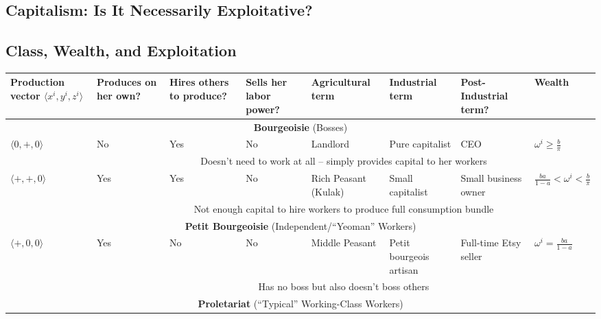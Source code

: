 \subsection{Capitalism: Is It Necessarily Exploitative?}

\subsection{Class, Wealth, and Exploitation}

\begin{table}[ht!]
{\fontsize{10}{10}\selectfont
\begin{tabularx}{\textwidth}{|p{1.6cm}||p{1.4cm}XXp{1.8cm}XXp{2.2cm}|} \hline
Production vector $\langle x^i, y^i, z^i\rangle$ & \multicolumn{1}{p{1.4cm}|}{Produces on her own?} & \multicolumn{1}{X|}{Hires others to produce?} & \multicolumn{1}{X|}{Sells her labor power?} & \multicolumn{1}{p{1.8cm}|}{Agricultural term} & \multicolumn{1}{X|}{Industrial term} & \multicolumn{1}{X|}{Post-Industrial term?} & Wealth \\ \hline \hline
\multicolumn{8}{|c|}{\textbf{Bourgeoisie} (Bosses)} \\ \hline
$\langle 0, +, 0 \rangle$ & No & Yes & No & Landlord & Pure capitalist & CEO & $\omega^i \geq \frac{b}{\pi}$ \\
 & \multicolumn{7}{c|}{Doesn't need to work at all -- simply provides capital to her workers} \\ \hline
$\langle +, +, 0 \rangle$ & Yes & Yes & No & Rich Peasant (Kulak) & Small capitalist & Small business owner & $\frac{ba}{1-a} < \omega^i < \frac{b}{\pi}$ \\
 & \multicolumn{7}{c|}{Not enough capital to hire workers to produce full consumption bundle} \\\hline \hline
\multicolumn{8}{|c|}{\textbf{Petit Bourgeoisie} (Independent/``Yeoman'' Workers)} \\ \hline
$\langle +, 0, 0 \rangle$ & Yes & No & No & Middle Peasant & Petit bourgeois artisan & Full-time Etsy seller & $\omega^i = \frac{ba}{1-a}$ \\
 & \multicolumn{7}{c|}{Has no boss but also doesn't boss others} \\\hline \hline
\multicolumn{8}{|c|}{\textbf{Proletariat} (``Typical'' Working-Class Workers)} \\ \hline

\end{tabularx}}
\end{table}
